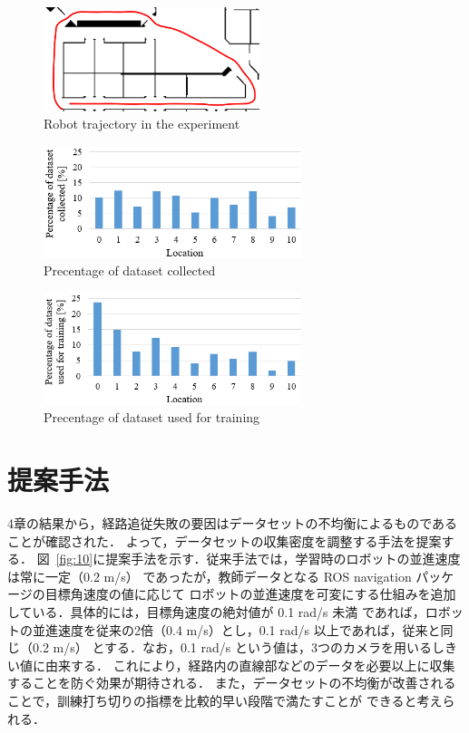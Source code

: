 \documentclass{jarticle}
\renewcommand{\figurename}{図~}
\newcommand{\figref}[1]{\figurename\ref{#1}}
\begin{document}
\begin{figure}[h!]
  \centering
   \includegraphics[height=30.3mm]{./png/failed.png}
   \caption{Robot trajectory in the experiment}
   \label{fig:7}
\end{figure}

\newpage

\begin{figure}[h!]
  \centering
   \includegraphics[height=32.8mm]{./png/set2.png}
   \caption{Precentage of dataset collected}
   \label{fig:8}
\end{figure}

\begin{figure}[h!]
  \centering
   \includegraphics[height=32.8mm]{./png/gaku2.png}
   \caption{Precentage of dataset used for training}
   \label{fig:9}
\end{figure}


\section{提案手法}
4章の結果から，経路追従失敗の要因はデータセットの不均衡によるものであることが確認された．
よって，データセットの収集密度を調整する手法を提案する．
\figref{fig:10}に提案手法を示す．従来手法では，学習時のロボットの並進速度は常に一定（0.2 m/s）
であったが，教師データとなる ROS navigation パッケージの目標角速度の値に応じて
ロボットの並進速度を可変にする仕組みを追加している．具体的には，目標角速度の絶対値が 0.1 rad/s 未満
であれば，ロボットの並進速度を従来の2倍（0.4 m/s）とし，0.1 rad/s 以上であれば，従来と同じ（0.2 m/s）
とする．なお，0.1 rad/s という値は，3つのカメラを用いるしきい値に由来する．
これにより，経路内の直線部などのデータを必要以上に収集することを防ぐ効果が期待される．
また，データセットの不均衡が改善されることで，訓練打ち切りの指標を比較的早い段階で満たすことが
できると考えられる．
\end{document}
